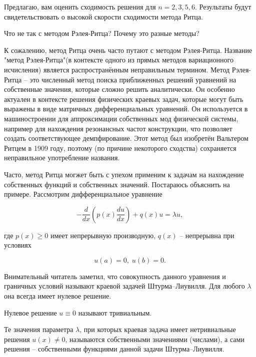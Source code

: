 \documentclass{article}
\begin{document}
\noindent Предлагаю, вам оценить сходимость решения для $n = 2, 3, 5, 6$. Результаты будут свидетельствовать о высокой скорости сходимости метода Ритца.

\newpage
\begin{question}
	Что не так с методом Рэлея-Ритца? Почему это разные методы?
\end{question}

\begin{warn}[Важно!]
	К сожалению, метод Ритца очень часто путают с методом Рэлея-Ритца. Название "метод Рэлея-Ритца"\;(в контексте одного из прямых методов вариационного исчисления) является распространённым неправильным термином. Метод Рэлея-Ритца -- это численный метод поиска приближенных решений уравнений на собственные значения, которые сложно решить аналитически. Он особенно актуален в контексте решения физических краевых задач, которые могут быть выражены в виде матричных дифференциальных уравнений. Он используется в машиностроении для аппроксимации собственных мод физической системы, например для нахождения резонансных частот конструкции, что позволяет создать соответствующее демпфирование. Этот метод был изобретён Вальтером Ритцем в 1909 году, поэтому (по причине некоторого сходства) сохраняется неправильное употребление названия.
\end{warn}

Часто, метод Ритца могжет быть с упехом применим к задачам на нахождение собственных функций и собственных значений. Постараюсь объяснить на примере. Рассмотрим дифференциальное уравнение

\begin{displaymath}
	- \frac{d}{dx} \left( p(x) \frac{du}{dx} \right) + q(x)u = \lambda u,
\end{displaymath}

\noindent где $p(x) \geq 0$ имеет непрерывную производную, $q(x)$ -- непрерывна при условиях

\begin{displaymath}
	u(a) = 0, \; u(b) = 0.
\end{displaymath}

Внимательный читатель заметил, что совокупность данного уравнения и граничных условий называют краевой задачей Штурма--Лиувилля. Для любого $\lambda$ она всегда имеет нулевое решение.

\begin{info}
	Нулевое решение $u \equiv 0$ называют тривиальным.
\end{info}

Те значения параметра $\lambda$, при которых краевая задача имеет нетривиальные решения $u(x) \neq 0$, называются собственными значениями (числами), а сами решения -- собственными функциями данной задачи Штурма--Лиувилля.
\end{document}
